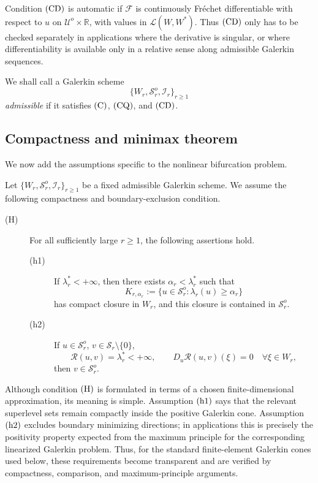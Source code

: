 \documentclass[preprint,10pt]{elsarticle}
\numberwithin{equation}{section}
\begin{document}
Condition \({\rm (CD)}\) is automatic if \(\mathcal F\) is continuously
Fréchet differentiable with respect to \(u\) on
\(\mathcal U^o\times\mathbb R\), with values in \(\mathcal L(W,W^*)\).
Thus \({\rm (CD)}\) only has to be checked separately in applications where
the derivative is singular, or where differentiability is available only in
a relative sense along admissible Galerkin sequences.

We shall call a Galerkin scheme
\[
\{W_r,\mathcal S_r^o,\mathcal I_r\}_{r\ge1}
\]
\emph{admissible} if it satisfies
\({\rm (C)}\), \({\rm (CQ)}\), and \({\rm (CD)}\).

\subsection{Compactness and minimax theorem}

We now add the assumptions specific to the nonlinear bifurcation problem.

Let
\(\{W_r,\mathcal S_r^o,\mathcal I_r\}_{r\ge1}\) be a fixed admissible Galerkin
scheme. We assume the following compactness and boundary-exclusion condition.

\begin{description}
	\item[{\rm (H)}]
	For all sufficiently large \(r\ge1\), the following assertions hold.
	\begin{description}
		\item[{\rm (h1)}]
		If \(\lambda_r^*<+\infty\), then there exists
		\(\alpha_r<\lambda_r^*\) such that
		\[
		K_{r,\alpha_r}:=
		\{u\in\mathcal S_r^o:\lambda_r(u)\ge\alpha_r\}
		\]
		has compact closure in \(W_r\), and this closure is contained in
		\(\mathcal S_r^o\).
		
		\item[{\rm (h2)}]
		If \(u\in\mathcal S_r^o\), \(v\in\mathcal S_r\setminus\{0\}\),
		\[
		\mathcal R(u,v)=\lambda_r^*<+\infty,
		\qquad
		D_u\mathcal R(u,v)(\xi)=0\quad\forall\xi\in W_r,
		\]
		then \(v\in\mathcal S_r^o\).
	\end{description}
\end{description}

Although condition \({\rm (H)}\) is formulated in terms of a chosen
finite-dimensional approximation, its meaning is simple. Assumption
\({\rm (h1)}\) says that the relevant superlevel sets remain compactly inside
the positive Galerkin cone. Assumption \({\rm (h2)}\) excludes boundary
minimizing directions; in applications this is precisely the positivity
property expected from the maximum principle for the corresponding linearized
Galerkin problem. Thus, for the standard finite-element Galerkin cones used
below, these requirements become transparent and are verified by compactness,
comparison, and maximum-principle arguments.
\end{document}
